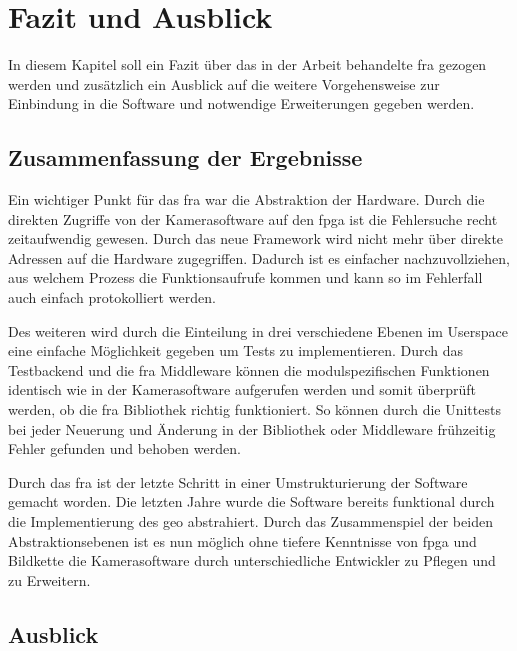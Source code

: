 \chapter{Fazit und Ausblick}

In diesem Kapitel soll ein Fazit über das in der Arbeit behandelte \ac{fra} gezogen werden und zusätzlich ein Ausblick auf die weitere Vorgehensweise zur Einbindung in die Software und notwendige Erweiterungen gegeben werden.


\section{Zusammenfassung der Ergebnisse}

Ein wichtiger Punkt für das \ac{fra} war die Abstraktion der Hardware. Durch die direkten Zugriffe von der Kamerasoftware auf den \ac{fpga} ist die Fehlersuche recht zeitaufwendig gewesen. Durch das neue Framework wird nicht mehr über direkte Adressen auf die Hardware zugegriffen. Dadurch ist es einfacher nachzuvollziehen, aus welchem Prozess die Funktionsaufrufe kommen und kann so im Fehlerfall auch einfach protokolliert werden.


Des weiteren wird durch die Einteilung in drei verschiedene Ebenen im Userspace eine einfache Möglichkeit gegeben um Tests zu implementieren. Durch das Testbackend und die \ac{fra} Middleware können die modulspezifischen Funktionen identisch wie in der Kamerasoftware aufgerufen werden und somit überprüft werden, ob die \ac{fra} Bibliothek richtig funktioniert. So können durch die Unittests bei jeder Neuerung und Änderung in der Bibliothek oder Middleware frühzeitig Fehler gefunden und behoben werden.


Durch das \ac{fra} ist der letzte Schritt in einer Umstrukturierung der Software gemacht worden. Die letzten Jahre wurde die Software bereits funktional durch die Implementierung des \ac{geo} abstrahiert. Durch das Zusammenspiel der beiden Abstraktionsebenen ist es nun möglich ohne tiefere Kenntnisse von \ac{fpga} und Bildkette die Kamerasoftware durch unterschiedliche Entwickler zu Pflegen und zu Erweitern.


\section{Ausblick}

